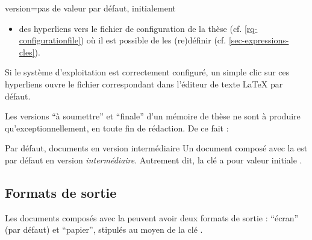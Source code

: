{\begin{docKey}{version}{=\textbar{}\textbar{}\textbar{}\textbar{}\textbar{}}{pas
      de valeur par défaut, initialement }
\begin{description}
\begin{itemize}
\begin{enumerate}
\begin{enumerate}
\begin{itemize}
            \item des hyperliens vers le fichier de configuration de la thèse
              (cf.  \vref{rq-configurationfile}) où il est possible de les
              (re)définir (cf. \vref{sec-expressions-cles}).
            \end{itemize}
          \end{enumerate}
          Si le système d'exploitation est correctement configuré, un simple
          clic sur ces hyperliens ouvre le fichier correspondant dans l'éditeur
          de texte \LaTeX{} par défaut.
        \end{enumerate}
      \end{itemize}
    \end{description}
  \end{docKey}
}

Les versions \enquote{à soumettre} et \enquote{finale} d'un mémoire de thèse ne
sont à produire qu'exceptionnellement, en toute fin de rédaction. De ce fait :
\begin{dbwarning}{Par défaut, documents en version intermédiaire}{}
  Un document composé avec la \yatCl{} est par défaut en version
  \emph{intermédiaire}. Autrement dit, la clé  a pour valeur
  initiale .
\end{dbwarning}

\subsection{Formats de sortie}
\label{sec-formats-de-sortie}
%

Les documents composés avec la \yatCl{} peuvent avoir deux formats de sortie :
\enquote{écran} (par défaut) et \enquote{papier}, stipulés au moyen de la clé
.

